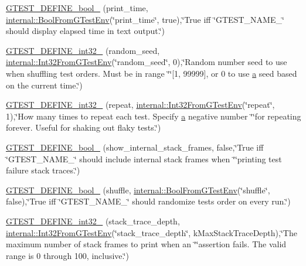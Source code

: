 \begin{DoxyCompactItemize}
\item 
\hyperlink{namespacetesting_a51fb68302e8e3fce5bd61340843a6e6a}{G\+T\+E\+S\+T\+\_\+\+D\+E\+F\+I\+N\+E\+\_\+bool\+\_\+} (print\+\_\+time, \hyperlink{namespacetesting_1_1internal_a67132cdce23fb71b6c38ee34ef81eb4c}{internal\+::\+Bool\+From\+G\+Test\+Env}(\char`\"{}print\+\_\+time\char`\"{}, true),\char`\"{}True iff \char`\"{}G\+T\+E\+S\+T\+\_\+\+N\+A\+M\+E\+\_\+\char`\"{} should display elapsed time in text output.\char`\"{})
\item 
\hyperlink{namespacetesting_a25e098abb7ce93d06582d48434be90c7}{G\+T\+E\+S\+T\+\_\+\+D\+E\+F\+I\+N\+E\+\_\+int32\+\_\+} (random\+\_\+seed, \hyperlink{namespacetesting_1_1internal_a0f7e728793f9e6cb0aa2b69eaa468bf3}{internal\+::\+Int32\+From\+G\+Test\+Env}(\char`\"{}random\+\_\+seed\char`\"{}, 0),\char`\"{}Random number seed to use when shuffling test orders.  Must be in range \char`\"{}\char`\"{}\mbox{[}1, 99999\mbox{]}, or 0 to use \hyperlink{_07copy_08_2_read_camera_model_8m_a551a3d351eadcc0b9b1a2f24f0fb5ea0}{a} seed based on the current time.\char`\"{})
\item 
\hyperlink{namespacetesting_a8b2c1dad0764e0984486bae49a988f0e}{G\+T\+E\+S\+T\+\_\+\+D\+E\+F\+I\+N\+E\+\_\+int32\+\_\+} (repeat, \hyperlink{namespacetesting_1_1internal_a0f7e728793f9e6cb0aa2b69eaa468bf3}{internal\+::\+Int32\+From\+G\+Test\+Env}(\char`\"{}repeat\char`\"{}, 1),\char`\"{}How many times to repeat each test.  Specify \hyperlink{_07copy_08_2_read_camera_model_8m_a551a3d351eadcc0b9b1a2f24f0fb5ea0}{a} negative number \char`\"{}\char`\"{}for repeating forever.  Useful for shaking out flaky tests.\char`\"{})
\item 
\hyperlink{namespacetesting_a5982e64522de6804cbf5d1732fd62751}{G\+T\+E\+S\+T\+\_\+\+D\+E\+F\+I\+N\+E\+\_\+bool\+\_\+} (show\+\_\+internal\+\_\+stack\+\_\+frames, false,\char`\"{}True iff \char`\"{}G\+T\+E\+S\+T\+\_\+\+N\+A\+M\+E\+\_\+\char`\"{} should include internal stack frames when \char`\"{}\char`\"{}printing test failure stack traces.\char`\"{})
\item 
\hyperlink{namespacetesting_acc11444cd1c18500658a35e02d4f2cf9}{G\+T\+E\+S\+T\+\_\+\+D\+E\+F\+I\+N\+E\+\_\+bool\+\_\+} (shuffle, \hyperlink{namespacetesting_1_1internal_a67132cdce23fb71b6c38ee34ef81eb4c}{internal\+::\+Bool\+From\+G\+Test\+Env}(\char`\"{}shuffle\char`\"{}, false),\char`\"{}True iff \char`\"{}G\+T\+E\+S\+T\+\_\+\+N\+A\+M\+E\+\_\+\char`\"{} should randomize tests\textquotesingle{} order on every run.\char`\"{})
\item 
\hyperlink{namespacetesting_aaedd7015b957f3c37662c289b645e7d9}{G\+T\+E\+S\+T\+\_\+\+D\+E\+F\+I\+N\+E\+\_\+int32\+\_\+} (stack\+\_\+trace\+\_\+depth, \hyperlink{namespacetesting_1_1internal_a0f7e728793f9e6cb0aa2b69eaa468bf3}{internal\+::\+Int32\+From\+G\+Test\+Env}(\char`\"{}stack\+\_\+trace\+\_\+depth\char`\"{}, k\+Max\+Stack\+Trace\+Depth),\char`\"{}The maximum number of stack frames to print when an \char`\"{}\char`\"{}assertion fails.  The valid range is 0 through 100, inclusive.\char`\"{})

\end{DoxyCompactItemize}
